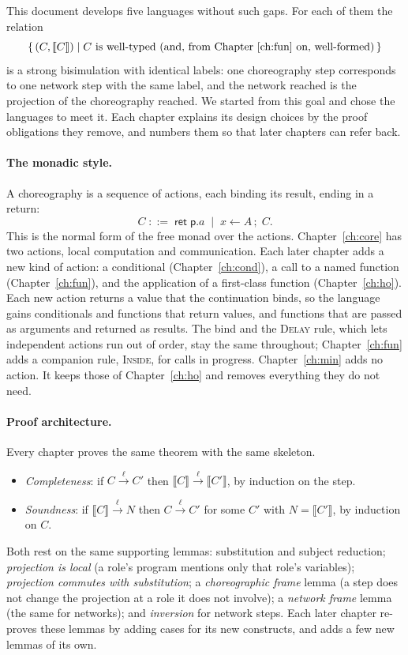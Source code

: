 \documentclass[11pt]{report}
\theoremstyle{plain}
\theoremstyle{definition}
\theoremstyle{remark}
\newcommand{\kw}[1]{\mathsf{#1}}
\newcommand{\pp}{\mathsf{p}}
\newcommand{\bind}[3]{#1 \leftarrow #2\,;\;#3}
\newcommand{\cret}[1]{\kw{ret}\;#1}
\newcommand{\lto}[1]{\xrightarrow{\;#1\;}}
\newcommand{\projn}[1]{\llbracket #1 \rrbracket}
\newcommand{\rn}[1]{{\normalfont\scshape #1}}
\begin{document}
This document develops five languages without such gaps.  For each of them
the relation
\[
  \{\,(C, \projn{C}) \mid C \text{ is well-typed (and, from Chapter~\ref{ch:fun} on, well-formed)}\,\}
\]
is a strong bisimulation with identical labels: one choreography step
corresponds to one network step with the same label, and the network reached
is the projection of the choreography reached.  We started from this goal and
chose the languages to meet it.  Each chapter explains its design choices by
the proof obligations they remove, and numbers them so that later chapters
can refer back.

\paragraph{The monadic style.}
A choreography is a sequence of actions, each binding its result, ending in a
return:
\[
  C \;::=\; \cret{\pp.a} \;\mid\; \bind{x}{A}{C}.
\]
This is the normal form of the free monad over the actions.  Chapter~\ref{ch:core}
has two actions, local computation and communication.  Each later chapter
adds a new kind of action: a conditional (Chapter~\ref{ch:cond}), a call to a
named function (Chapter~\ref{ch:fun}), and the application of a first-class
function (Chapter~\ref{ch:ho}).  Each new action returns a value that the
continuation binds, so the language gains conditionals and functions that
return values, and functions that are passed as arguments and returned as
results.  The bind and the \rn{Delay} rule, which lets independent actions run
out of order, stay the same throughout; Chapter~\ref{ch:fun} adds a companion
rule, \rn{Inside}, for calls in progress.  Chapter~\ref{ch:min} adds no
action.  It keeps those of Chapter~\ref{ch:ho} and removes everything they
do not need.

\paragraph{Proof architecture.}
Every chapter proves the same theorem with the same skeleton.
\begin{itemize}[nosep]
\item \emph{Completeness}: if $C\lto{\ell}C'$ then $\projn{C}\lto{\ell}\projn{C'}$, by induction on the step.
\item \emph{Soundness}: if $\projn{C}\lto{\ell}N$ then $C\lto{\ell}C'$ for some $C'$ with $N=\projn{C'}$, by induction on $C$.
\end{itemize}
Both rest on the same supporting lemmas: substitution and subject reduction;
\emph{projection is local} (a role's program mentions only that role's
variables); \emph{projection commutes with substitution}; a
\emph{choreographic frame} lemma (a step does not change the projection at a
role it does not involve); a \emph{network frame} lemma (the same for
networks); and \emph{inversion} for network steps.  Each later chapter
re-proves these lemmas by adding cases for its new constructs, and adds a few
new lemmas of its own.
\end{document}
